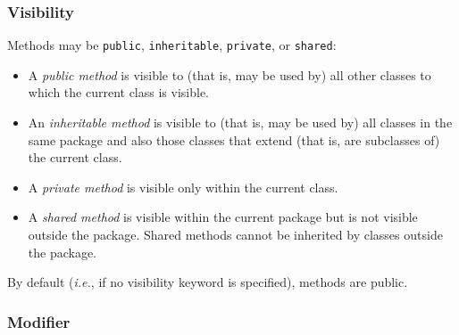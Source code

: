 \subsubsection{Visibility}
 
Methods may be \texttt{public}, \texttt{inheritable},
\texttt{private}, or \texttt{shared}:
\begin{itemize}
\item A \emph{public method} is visible to (that is, may be used by)
all other classes to which the current class is visible.
\item An \emph{inheritable method} is visible to (that is, may be used
by) all classes in the same package and also those classes that extend
(that is, are subclasses of) the current class.
\item A \emph{private method} is visible only within the current
class.
\item 
A \emph{shared method} is visible within the current package
but is not visible outside the package.  Shared methods cannot be
inherited by classes outside the package.
\end{itemize}
 
By default (\emph{i.e.}, if no visibility keyword is specified),  methods
are public.
\subsubsection{Modifier}
 
